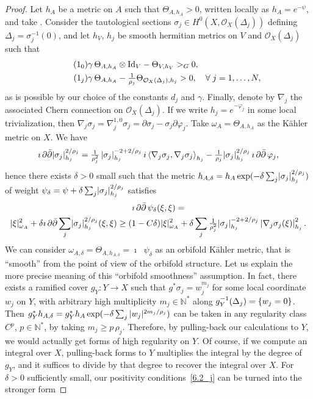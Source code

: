 \documentclass[10pt,a4paper]{article}
\DeclareMathOperator{\ddbar}{\partial\bar\partial}
\DeclarePairedDelimiter{\abs}{\lvert}{\rvert}
\newcommand*\Id{\mathrm{Id}}
\newcommand*\cO{\mathcal{O}}
\newcommand*\bN{\mathbb{N}}
\let\geq\geqslant
\let\oldforall\forall
\renewcommand*{\forall}{\mathrel{\oldforall}}
\numberwithin{equation}{section}
\begin{document}
\begin{proof}
Let $h_A$ be a metric on $A$ such that $\Theta_{A,h_A}>0$, written locally as $h_A=e^{-\psi}$, and take
. Consider the tautological sections
$\sigma_j\in H^0(X,\cO_X(\Delta_j))$ defining $\Delta_j=\sigma_j^{-1}(0)$, and let $h_V$, $h_j$ be smooth hermitian metrics on
$V$ and $\cO_X(\Delta_j)$ such that
\begin{align}
\stepcounter{equation}
\tag{$\theequation_0$} &
\gamma\,\Theta_{A,h_A}\otimes\Id_V-\Theta_{V,h_V}>_G0,
\\
\tag{$\theequation_j$}\label{6.2_j}
&
\gamma\,\Theta_{A,h_A}-\tfrac{1}{\rho_j}\Theta_{\cO_X(\Delta_j),h_j}>0,\quad
\forall j=1,\dotsc,N,
\end{align}
as is possible by our choice of the constants $d_j$ and $\gamma$. Finally, denote by $\nabla_j$ the associated Chern connection on
$\cO_X(\Delta_j)$. If we write $h_j=e^{-\varphi_j}$ in some local trivialization, then $\nabla_j\sigma_j=\nabla_j^{1,0}\sigma_j=
\partial\sigma_j-\sigma_j\partial\varphi_j$. Take $\omega_A=\Theta_{A,h_A}$ as the K\"ahler metric on $X$. We have
\[
\imath\ddbar\abs{\sigma_j}_{h_j}^{2/\rho_j}=
\tfrac{1}{\rho_j^2}\,\abs{\sigma_j}_{h_j}^{-2+2/\rho_j}\, i\left\langle\nabla_j\sigma_j,\nabla_j\sigma_j\right\rangle_{h_j} -\tfrac{1}{\rho_j}\abs{\sigma_j}_{h_j}^{2/\rho_j}\,\imath\ddbar\varphi_j,
\]
hence there exists $\delta>0$ small such that the metric
$h_{A,\delta}=h_A\exp(-\delta\sum_j\abs{\sigma_j}_{h_j}^{2/\rho_j})$ of weight $\psi_\delta=\psi+\delta\sum_j\abs{\sigma_j}_{h_j}^{2/\rho_j}$ satisfies
\begin{multline*}
\imath\ddbar\psi_\delta(\xi,\xi) =
\\
\abs{\xi}^2_{\omega_A} +
\delta\imath\ddbar
\sum_j\abs{\sigma_j}_{h_j}^{2/\rho_j}(\xi,\xi)
\ge (1-C\delta)\abs{\xi}^2_{\omega_A} +
\delta\sum_j\tfrac{1}{\rho_j^2}\abs{\sigma_j}_{h_j}^{-2+2/\rho_j}
\left|\nabla_j\sigma_j(\xi)\right|_{h_j}^2.
\end{multline*}
We can consider $\omega_{A,\delta}=\Theta_{A,h_{A,\delta}}=\imath\ddbar\psi_\delta$ as an orbifold K\"ahler metric, that is ``smooth'' from the point of view of the orbifold structure. Let us explain the more precise meaning of this ``orbifold smoothness'' assumption. In fact, there exists a ramified cover $g_Y\colon Y\to X$ such that $g^*\sigma_j=w_j^{m_j}$ for some local coordinate $w_j$ on $Y$, with arbitrary high multiplicity $m_j\in\bN^*$ along $\smash{g_Y^{-1}}(\Delta_j)=\{w_j=0\}$. Then $g_Y^*h_{A,\delta}=g_Y^*h_A\exp(-\delta\sum_j \smash{\abs{w_j}^{2m_j/\rho_j})}$ can be taken in any regularity class $C^p$, $p\in \bN^*$, by taking $m_j\geq p\,\rho_j$. Therefore, by pulling-back our calculations to $Y$, we would actually get forms of high regularity on $Y$. Of course, if we compute an integral over $X$, pulling-back forms to $Y$ multiplies the integral by the degree of $g_Y$, and it suffices to divide by that degree to recover the integral over $X$. For $\delta>0$ sufficiently small, our positivity conditions~\eqref{6.2_j} can be turned into the stronger form

\end{proof}
\end{document}
